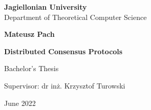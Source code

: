 \begin{titlepage}
	\begin{center}
        
		\large
		\textbf{Jagiellonian University}\\
		Department of Theoretical Computer Science\\

		\vspace{1.5cm}

		\Large
		\textbf{Mateusz Pach}

		\vspace*{2cm}

		\textbf{\LARGE Distributed Consensus Protocols}
		
		\vspace{0.5cm}
		\large
		
		\vfill
		\Large
		Bachelor's Thesis

		\vfill
		\Large
		Supervisor: dr in\.z. Krzysztof Turowski
		
		\vspace{0.8cm}
		
		June 2022
		
    \end{center}
\end{titlepage}